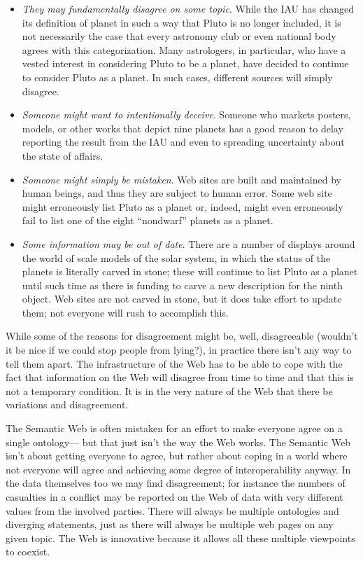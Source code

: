 \begin{itemize}
\item
  \emph{They may fundamentally disagree on some topic}. While the IAU
  has changed its definition of planet in such a way that Pluto is no
  longer included, it is not necessarily the case that every astronomy
  club or even national body agrees with this categorization. Many
  astrologers, in particular, who have a vested interest in considering
  Pluto to be a planet, have decided to continue to consider Pluto as a
  planet. In such cases, different sources will simply disagree.
\item
  \emph{Someone might want to intentionally deceive}. Someone who
  markets posters, models, or other works that depict nine planets has a
  good reason to delay reporting the result from the IAU and even to
  spreading uncertainty about the state of affairs.
\item
  \emph{Someone might simply be mistaken}. Web sites are built and
  maintained by human beings, and thus they are subject to human error.
  Some web site might erroneously list Pluto as a planet or, indeed,
  might even erroneously fail to list one of the eight ``nondwarf''
  planets as a planet.
\item
  \emph{Some information may be out of date}. There are a number of
  displays around the world of scale models of the solar system, in
  which the status of the planets is literally carved in stone; these
  will continue to list Pluto as a planet until such time as there is
  funding to carve a new description for the ninth object. Web sites are
  not carved in stone, but it does take effort to update them; not
  everyone will rush to accomplish this.
\end{itemize}


While some of the reasons for disagreement might be, well, disagreeable
(wouldn't it be nice if we could stop people from lying?), in practice
there isn't any way to tell them apart. The infrastructure of the Web
has to be able to cope with the fact that information on the Web will
disagree from time to time and that this is not a temporary condition.
It is in the very nature of the Web that there be variations and
disagreement.

The Semantic Web is often mistaken for an effort to make everyone agree
on a single ontology--- but that just isn't the way the Web works. The
Semantic Web isn't about getting everyone to agree, but rather about
coping in a world where not everyone will agree and achieving some
degree of interoperability anyway. In the data themselves too we may
find disagreement; for instance the numbers of casualties in a conflict
may be reported on the Web of data with very different values from the
involved parties. There will always be multiple ontologies and diverging
statements, just as there will always be multiple web pages on any given
topic. The Web is innovative because it allows all these multiple
viewpoints to coexist.

